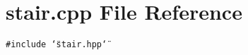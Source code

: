\section{stair.cpp File Reference}
\label{stair_8cpp}
{\tt \#include \char`\"{}stair.hpp\char`\"{}}\par
